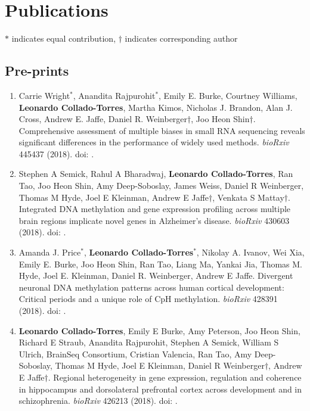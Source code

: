 \section{Publications}

$*$ indicates equal contribution, $\dagger$ indicates corresponding author

\subsection{Pre-prints}
    \begin{enumerate}
        \item Carrie Wright$^{*}$, Anandita Rajpurohit$^{*}$, Emily E. Burke, Courtney Williams, \textbf{Leonardo Collado-Torres}, Martha Kimos, Nicholas J. Brandon, Alan J. Cross, Andrew E. Jaffe, Daniel R. Weinberger$\dagger$, Joo Heon Shin$\dagger$. Comprehensive assessment of multiple biases in small RNA sequencing reveals significant differences in the performance of widely used methods. \emph{bioRxiv} 445437 (2018). doi: .
        
        \item Stephen A Semick, Rahul A Bharadwaj, \textbf{Leonardo Collado-Torres}, Ran Tao, Joo Heon Shin, Amy Deep-Soboslay, James Weiss, Daniel R Weinberger, Thomas M Hyde, Joel E Kleinman, Andrew E Jaffe$\dagger$, Venkata S Mattay$\dagger$. Integrated DNA methylation and gene expression profiling across multiple brain regions implicate novel genes in Alzheimer's disease. \emph{bioRxiv} 430603 (2018). doi: .
        
        \item Amanda J. Price$^{*}$, \textbf{Leonardo Collado-Torres}$^{*}$, Nikolay A. Ivanov, Wei Xia, Emily E. Burke, Joo Heon Shin, Ran Tao, Liang Ma, Yankai Jia, Thomas M. Hyde, Joel E. Kleinman, Daniel R. Weinberger, Andrew E Jaffe. Divergent neuronal DNA methylation patterns across human cortical development: Critical periods and a unique role of CpH methylation. \emph{bioRxiv} 428391 (2018). doi: .
        
        \item \textbf{Leonardo Collado-Torres}, Emily E Burke, Amy Peterson, Joo Heon Shin, Richard E Straub, Anandita Rajpurohit, Stephen A Semick, William S Ulrich, BrainSeq Consortium, Cristian Valencia, Ran Tao, Amy Deep-Soboslay, Thomas M Hyde, Joel E Kleinman, Daniel R Weinberger$\dagger$, Andrew E Jaffe$\dagger$. Regional heterogeneity in gene expression, regulation and coherence in hippocampus and dorsolateral prefrontal cortex across development and in schizophrenia. \emph{bioRxiv} 426213 (2018). doi: .
        

\end{enumerate}
